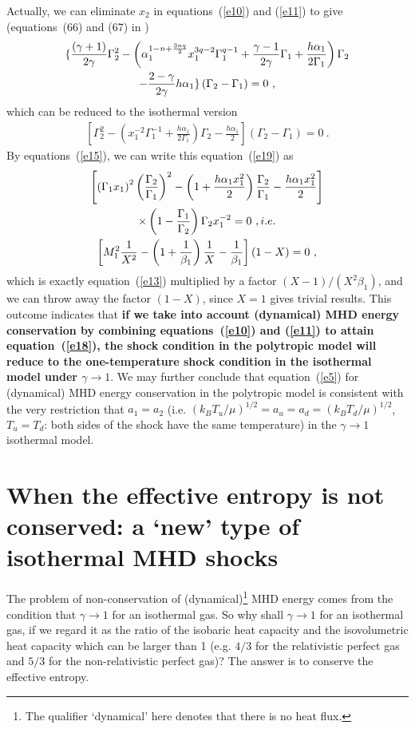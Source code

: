 \documentclass[fleqn,usenatbib]{mnras}
\begin{document}
Actually, we can eliminate $x_{2}$ in equations~(\ref{e10}) and (\ref{e11}) to give (equations~(66) and (67) in \citet{wang2008dynamic})
\begin{gather}
\lbrace \frac{(\gamma+1)}{2\gamma}\Gamma_{2}^{2}-\left(\alpha_{1}^{1-n+\frac{3nq}{2}}x_{1}^{3q-2}\Gamma_{1}^{q-1}+\frac{\gamma-1}{2\gamma}\Gamma_{1}+\frac{h\alpha_{1}}{2\Gamma_{1}}\right)\Gamma_{2}\notag\\
-\frac{2-\gamma}{2\gamma}h\alpha_{1}\rbrace \left(\Gamma_{2}-\Gamma_{1}\right)=0\ ,\label{e18}
\end{gather}
which can be reduced to the isothermal version
\begin{gather}
\left[\Gamma_{2}^{2}-\left(x_{1}^{-2}\Gamma_{1}^{-1}+\frac{h\alpha_{1}}{2\Gamma_{1}}\right)\Gamma_{2}-\frac{h\alpha_{1}}{2}\right]\left(\Gamma_{2}-\Gamma_{1}\right)=0\ .\label{e19}
\end{gather}
By equations~(\ref{e15}), we can write this equation~(\ref{e19}) as
\begin{gather}
\left[\left(\Gamma_{1}x_{1}\right)^{2}\left(\frac{\Gamma_{2}}{\Gamma_{1}}\right)^{2}-\left(1+\frac{h\alpha_{1}x_{1}^{2}}{2}\right)\frac{\Gamma_{2}}{\Gamma_{1}}-\frac{h\alpha_{1}x_{1}^{2}}{2}\right]\notag\\
\times \left(1-\frac{\Gamma_{1}}{\Gamma_{2}}\right)\Gamma_{2}x_{1}^{-2}=0\ , i.e.\notag\\
\left[M_{1}^{2}\frac{1}{X^{2}}-\left(1+\frac{1}{\beta_{1}}\right)\frac{1}{X}-\frac{1}{\beta_{1}}\right](1-X)=0\ ,\label{e20}
\end{gather}
which is exactly equation~(\ref{e13}) multiplied by a factor $(X-1)/\left(X^{2}\beta_{1}\right)$, and we can throw away the factor $\left(1-X\right)$, since $X=1$ gives trivial results. This outcome indicates that \textbf{if we take into account (dynamical) MHD energy conservation by combining equations~(\ref{e10}) and (\ref{e11}) to attain equation~(\ref{e18}), the shock condition in the polytropic model will reduce to the one-temperature shock condition in the isothermal model under $\gamma\rightarrow 1$}. We may further conclude that equation~(\ref{e5}) for (dynamical) MHD energy conservation in the polytropic model is consistent with the very restriction that $a_{1}=a_{2}$ (i.e. $\left(k_{B}T_{u}/\mu\right)^{1/2}=a_{u}=a_{d}=\left(k_{B}T_{d}/\mu\right)^{1/2}$, $T_{u}=T_{d}$: both sides of the shock have the same temperature) in the $\gamma\rightarrow 1$ isothermal model. 

\section{When the effective entropy is not conserved: a `new' type of isothermal MHD shocks}
\label{s2}
The problem of non-conservation of (dynamical)\footnote{The qualifier `dynamical' here denotes that there is no heat flux.} MHD energy comes from the condition that $\gamma\rightarrow 1$ for an isothermal gas. So why shall $\gamma\rightarrow 1$ for an isothermal gas, if we regard it as the ratio of the isobaric heat capacity and the isovolumetric heat capacity which can be larger than 1 (e.g. $4/3$ for the relativistic perfect gas and $5/3$ for the non-relativistic perfect gas)? The answer is to conserve the effective entropy. 
\end{document}
